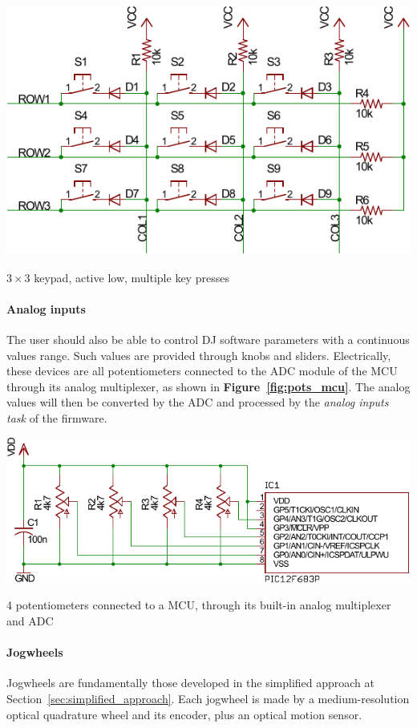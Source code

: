 \documentclass[a4paper,10pt]{article}
\makeatletter
\newenvironment{figurehere}{\def\@captype{figure}\vspace{2ex}}{\vspace{2ex}}
\newcommand{\citef}[1]{\textbf{Figure~\ref{#1}}}
\makeatother
\begin{document}
\begin{multicols}{2}
\begin{figurehere}
	\centering
	\includegraphics[keepaspectratio=true,width=0.8\columnwidth]{images/keypad.pdf}
	\caption{$ 3 \times 3 $ keypad, active low, multiple key presses}
	\label{fig:keypad}
\end{figurehere}


\paragraph{Analog inputs}
The user should also be able to control DJ software parameters with a 
continuous values range. Such values are provided through knobs and sliders.
Electrically, these devices are all potentiometers connected to the ADC module
of the MCU through its analog multiplexer, as shown in \citef{fig:pots_mcu}.
The analog values will then be converted by the ADC and processed by the
\emph{analog inputs task} of the firmware.

\begin{figurehere}
	\centering
	\includegraphics[keepaspectratio=true,width=\columnwidth]{images/pots_mcu.pdf}
	\caption{4 potentiometers connected to a MCU, through its built-in analog
	multiplexer and ADC}
	\label{fig:pots_mcu}
\end{figurehere}


\paragraph{Jogwheels}
Jogwheels are fundamentally those developed in the simplified approach at
Section~\ref{sec:simplified_approach}. Each jogwheel is made by a
medium-resolution optical quadrature wheel and its encoder, plus an optical
motion sensor.


\end{multicols}
\end{document}
